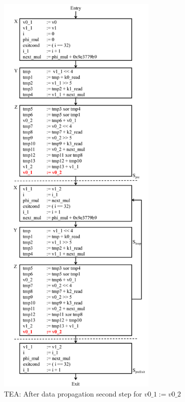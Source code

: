 \begin{figure}[H]
\begin{center}
\includegraphics[height=8in]{fig-proposal/tea-after-data-propagation2}
\caption{TEA: After data propagation second step for $v0\_1 := v0\_2$}
\label{fig:tea-after-data-propagation2}
\end{center}
\end{figure}

